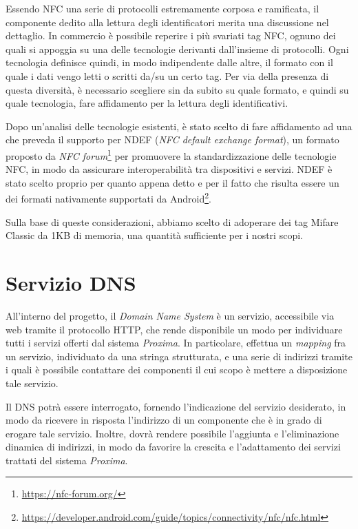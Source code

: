 \documentclass[a4paper,12pt]{report}
\begin{document}
Essendo NFC una serie di protocolli estremamente corposa e ramificata, il componente dedito alla lettura degli identificatori merita una discussione nel dettaglio. In commercio è possibile reperire i più svariati tag NFC, ognuno dei quali si appoggia su una delle tecnologie derivanti dall'insieme di protocolli. Ogni tecnologia definisce quindi, in modo indipendente dalle altre, il formato con il quale i dati vengo letti o scritti da/su un certo tag. Per via della presenza di questa diversità, è necessario scegliere sin da subito su quale formato, e quindi su quale tecnologia, fare affidamento per la lettura degli identificativi.

Dopo un'analisi delle tecnologie esistenti, è stato scelto di fare affidamento ad una che preveda il supporto per NDEF (\emph{NFC default exchange format}), un formato proposto da \emph{NFC forum}\footnote{\url{https://nfc-forum.org/}} per promuovere la standardizzazione delle tecnologie NFC, in modo da assicurare interoperabilità tra dispositivi e servizi. NDEF è stato scelto proprio per quanto appena detto e per il fatto che risulta essere un dei formati nativamente supportati da Android\footnote{\url{https://developer.android.com/guide/topics/connectivity/nfc/nfc.html}}.

Sulla base di queste considerazioni, abbiamo scelto di adoperare dei tag Mifare Classic da 1KB di memoria, una quantità sufficiente per i nostri scopi.

\section{Servizio DNS} \label{design-dns}
All'interno del progetto, il \emph{Domain Name System} è un servizio, accessibile via web tramite il protocollo HTTP, che rende disponibile un modo per individuare tutti i servizi offerti dal sistema \emph{Proxima}. In particolare, effettua un \emph{mapping} fra un servizio, individuato da una stringa strutturata, e una serie di indirizzi tramite i quali è possibile contattare dei componenti il cui scopo è mettere a disposizione tale servizio. 

Il DNS potrà essere interrogato, fornendo l'indicazione del servizio desiderato, in modo da ricevere in risposta l'indirizzo di un componente che è in grado di erogare tale servizio. Inoltre, dovrà rendere possibile l'aggiunta e l'eliminazione dinamica di indirizzi, in modo da favorire la crescita e l'adattamento dei servizi trattati del sistema \emph{Proxima}.
\end{document}
